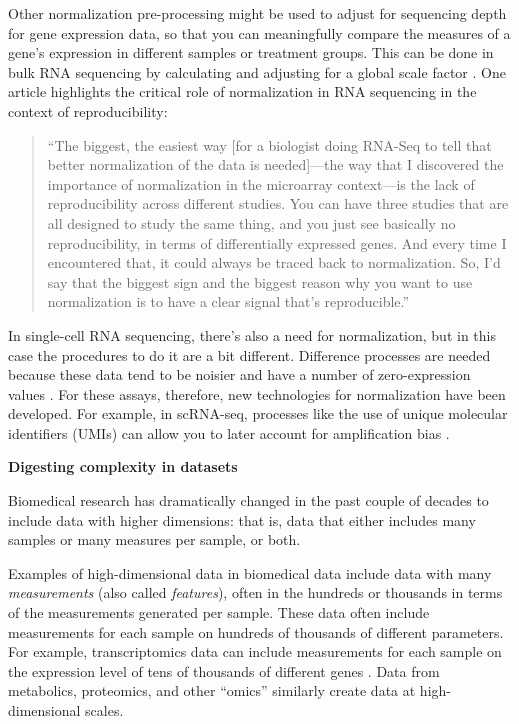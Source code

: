\documentclass[]{tufte-book}
\begin{document}
Other normalization pre-processing might be used to adjust for sequencing depth
for gene expression data, so that you can meaningfully compare the measures of a
gene's expression in different samples or treatment groups.
This can be done in bulk RNA sequencing by calculating and adjusting for a
global scale factor \citep{bacher2017scnorm}. One article highlights the critical
role of normalization in RNA sequencing in the context of reproducibility:

\begin{quote}
``The biggest, the easiest way {[}for a biologist doing RNA-Seq to tell that
better normalization of the data is needed{]}---the way that I discovered the
importance of normalization in the microarray context---is the lack of
reproducibility across different studies. You can have three studies that are
all designed to study the same thing, and you just see basically no
reproducibility, in terms of differentially expressed genes. And every time I
encountered that, it could always be traced back to normalization. So, I'd say
that the biggest sign and the biggest reason why you want to use normalization
is to have a clear signal that's reproducible.'' \citep{mak2011john}
\end{quote}

In single-cell RNA sequencing, there's also a need for normalization, but in
this case the procedures to do it are a bit different. Difference processes are
needed because these data tend to be noisier and have a number of
zero-expression values \citep{perkel2017single, bacher2017scnorm}. For these assays, therefore, new technologies for
normalization have been developed. For example, in scRNA-seq, processes like the
use of unique molecular identifiers (UMIs) can allow you to later account for
amplification bias \citep{haque2017practical}.

\textbf{Digesting complexity in datasets}

Biomedical research has dramatically changed in the past couple of decades to
include data with higher dimensions: that is, data that either includes many
samples or many measures per sample, or both.

Examples of high-dimensional data in biomedical data include data with many
\emph{measurements} (also called \emph{features}), often in the hundreds or thousands in
terms of the measurements generated per sample. These data often include
measurements for each sample on hundreds of thousands of different parameters.
For example, transcriptomics data can include measurements for each sample on
the expression level of tens of thousands of different genes
\citep{perkel2017single}. Data from metabolics, proteomics, and other ``omics''
similarly create data at high-dimensional scales.
\end{document}
